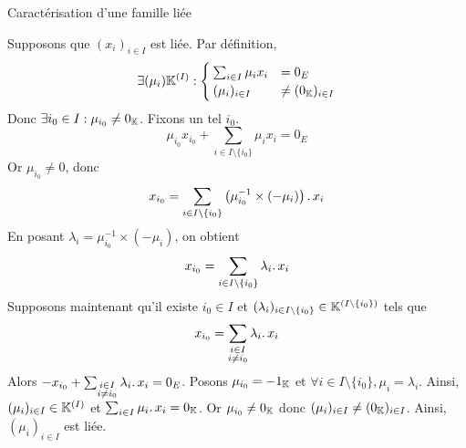 \documentclass{article}
\date{15 février 2025}
\begin{document}
\maketitle

\begin{question_kholle}
	[Une famille est liée si et seulement si l'un de ses vecteurs est une combinaison linéaires d'autres vecteurs de la famille.
		\begin{equation}
			(x_i)_{i \in I} \text{ est liée}
			\iff \exists i_0 \in I : \exists (\lambda_i)_{i \in I\setminus\{i_0\}} \in \K^{\left( I \setminus \{i_0\} \right)} :
			x_{i_0} = \sum_{\substack{i \in I \\ i \neq i_0}} \lambda_i \ldotp x_i
		\end{equation}]
	{Caractérisation d'une famille liée}

	Supposons que $(x_i)_{i \in I}$ est liée.
	Par définition,
	\[
		\displaystyle \exists (\mu_i) \mathbb K^{(I)} :
		\begin{cases}
			\sum_{i\in I}\mu_{i} x_{i} & =0_{E}                 \\
			(\mu_{i})_{i\in I}         & \neq (0_{\mathbb K})_{i\in I}
		\end{cases}
	\]
	Donc $\exists i_0 \in I : \mu_{i_0} \neq 0_{\mathbb K}$. Fixons un tel $i_0$. \\
	\[
		\mu_{i_0} x_{i_0} + \sum_{i \in I \setminus \{i_0\}} \mu_i x_i = 0_E
	\]
	Or $\mu_{i_0} \neq 0$, donc
	\[
		\displaystyle x_{i_0} = \sum_{i \in I \setminus \{i_0\}} \left( \mu_{i_0}^{-1} \times (-\mu_i) \right) \ldotp x_i
	\]
	En posant $\lambda_i = \mu_{i_0}^{-1} \times (-\mu_i)$, on obtient
	\[
		x_{i_0} = \displaystyle \sum_{i \in I \setminus \{i_0\}} \lambda_i \ldotp x_i
	\]
	Supposons maintenant qu’il existe $i_0 \in I$ et $(\lambda_i)_{i \in I\setminus\{i_0\}} \in \mathbb K^{\left( I \setminus \{i_0\} \right)}$ tels que
	\[
		x_{i_0} = \sum_{\substack{i \in I \\ i \neq i_0}} \lambda_i \ldotp x_i
	\]
	Alors $-x_{i_0} + \sum_{\substack{i \in I \\ i \neq i_0}} \lambda_i \ldotp x_i = 0_E$.
	Posons $\mu_{i_0} = - 1_{\mathbb K}$ et $\forall i \in I \!\setminus\! \{i_0\}, \mu_i = \lambda_i$.
	Ainsi, $(\mu_i)_{i \in I} \in \mathbb K^{(I)}$ et $\sum_{i \in I} \mu_i \ldotp x_i = 0_{\mathbb K}$. Or $\mu_{i_0} \neq 0_{\mathbb K}$ donc $(\mu_i)_{i \in I} \neq (0_{\mathbb K})_{i \in I}$.
	Ainsi, $(\mu_i)_{i \in I}$ est liée.
\end{question_kholle}
\end{document}
